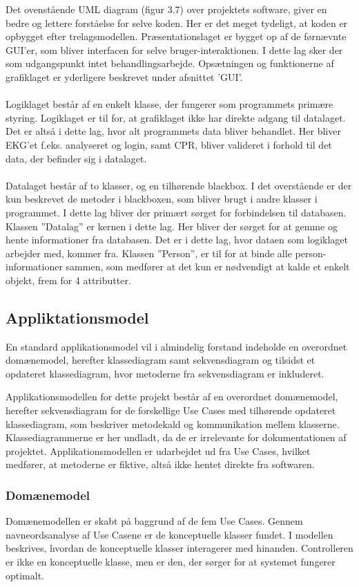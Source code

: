 Det ovenstående UML diagram (figur 3.7) over projektets software, giver en bedre og lettere forståelse for selve koden. Her er det meget tydeligt, at koden er opbygget efter trelagsmodellen. Præsentationslaget er bygget op af de førnævnte GUI’er, som bliver interfacen for selve bruger-interaktionen. I dette lag sker der som udgangspunkt intet behandlingsarbejde. Opsætningen og funktionerne af grafiklaget er yderligere beskrevet under afsnittet ’GUI’.\\ \\
Logiklaget består af en enkelt klasse, der fungerer som programmets primære styring. Logiklaget er til for, at grafiklaget ikke har direkte adgang til datalaget. Det er altså i dette lag, hvor alt programmets data bliver behandlet.  Her bliver EKG’et f.eks. analyseret og login, samt CPR, bliver valideret i forhold til det data, der befinder sig i datalaget. \\ \\
Datalaget består af to klasser, og en tilhørende blackbox. I det overstående er der kun beskrevet de metoder i blackboxen, som bliver brugt i andre klasser i programmet. I dette lag bliver der primært sørget for forbindelsen til databasen. Klassen ”Datalag” er kernen i dette lag. Her bliver der sørget for at gemme og hente informationer fra databasen. Det er i dette lag, hvor dataen som logiklaget arbejder med, kommer fra. Klassen ”Person”, er til for at binde alle person-informationer sammen, som medfører at det kun er nødvendigt at kalde et enkelt objekt, frem for 4 attributter. 

\subsection{Appliktationsmodel}
En standard applikationsmodel vil i almindelig forstand indeholde en overordnet domænemodel, herefter klassediagram samt sekvensdiagram og tilsidst et opdateret klassediagram, hvor metoderne fra sekvensdiagram er inkluderet. 

Applikationsmodellen for dette projekt består af en overordnet domænemodel, herefter sekvensdiagram for de forskellige Use Cases med tilhørende opdateret klassediagram, som beskriver metodekald og kommunikation mellem klasserne. Klassediagrammerne er her undladt, da de er irrelevante for dokumentationen af projektet. Applikationsmodellen er udarbejdet ud fra Use Cases, hvilket medfører, at metoderne er fiktive, altså ikke hentet direkte fra softwaren.  

\subsubsection{Domænemodel}
Domænemodellen er skabt på baggrund af de fem Use Cases. Gennem navneordsanalyse af Use Casene er de konceptuelle klasser fundet. I modellen beskrives, hvordan de konceptuelle klasser interagerer med hinanden. Controlleren er ikke en konceptuelle klasse, men er den, der sørger for at systemet fungerer optimalt.

